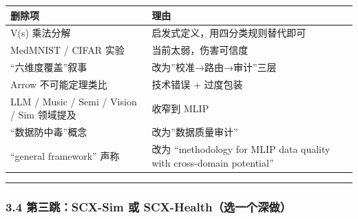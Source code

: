 \documentclass[
  12pt,
]{ctexart}
\begin{document}
\begin{longtable}[]{@{}
  >{\raggedright\arraybackslash}p{}
  >{\raggedright\arraybackslash}p{}@{}}
\toprule\noalign{}
\begin{minipage}[b]{\linewidth}\raggedright
删除项
\end{minipage} & \begin{minipage}[b]{\linewidth}\raggedright
理由
\end{minipage} \\
\midrule\noalign{}
\endhead
\bottomrule\noalign{}
\endlastfoot
V(s) 乘法分解 & 启发式定义，用四分类规则替代即可 \\
MedMNIST / CIFAR 实验 & 当前太弱，伤害可信度 \\
``六维度覆盖''叙事 & 改为''校准→路由→审计''三层 \\
Arrow 不可能定理类比 & 技术错误 + 过度包装 \\
LLM / Music / Semi / Vision / Sim 领域提及 & 收窄到 MLIP \\
``数据防中毒''概念 & 改为''数据质量审计'' \\
``general framework'' 声称 & 改为 ``methodology for MLIP data quality
with cross-domain potential'' \\
\end{longtable}

\begin{center}\rule{0.5\linewidth}{0.5pt}\end{center}

\subsubsection{3.4 第三跳：SCX-Sim 或
SCX-Health（选一个深做）}\label{ux7b2cux4e09ux8df3scx-sim-ux6216-scx-healthux9009ux4e00ux4e2aux6df1ux505a}
\end{document}
